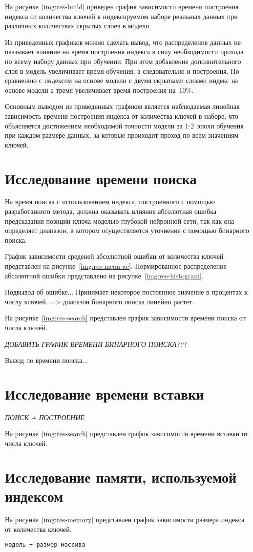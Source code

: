 На рисунке~\ref{img:res-build} приведен график зависимости времени построения
индекса от количества ключей в индексируемом наборе реальных данных при
различных количествах скрытых слоев в модели.


Из приведенных графиков можно сделать вывод, что распределение данных не
оказывает влияние на время построения индекса в силу необходимости прохода по
всему набору данных при обучении. При этом добавление дополнительного слоя в
модель увеличивает время обучения, а следовательно и построения. По сравнению с
индексом на основе модели с двумя скрытыми слоями индекс на основе модели с
тремя увеличивает время построения на~10\%.

Основным выводом из приведенных графиков является наблюдаемая линейная
зависимость времени построения индекса от количества ключей в наборе, что
объясняется достижением необходимой точности модели за \mbox{1-2~эпохи} обучения
при каждом размере данных, за которые проиходит проход по всем значениям ключей.

\section{Исследование времени поиска}

На время поиска с использованием индекса, построенного с помощью разработанного
метода, должна оказывать влияние абсолютная ошибка предсказания позиции ключа
моделью глубокой нейронной сети, так как она определяет диапазон, в котором
осуществляется уточнение с помощью бинарного поиска.

График зависимости среденей абсолютной ошибки от количества ключей представлен
на рисунке~\ref{img:res-mean-ae}. Нормированное распределение абсолютной ошибки
представлено на рисунке~\ref{img:res-histogram}.

Подвывод об ошибке... Принимает некоторое постоянное значение в процентах к
числу ключей. => диапазон бинарного поиска линейно растет.

На рисунке~\ref{img:res-search} представлен график зависимости времени поиска от
числа ключей.

\textit{ДОБАВИТЬ ГРАФИК ВРЕМЕНИ БИНАРНОГО ПОИСКА???}

Вывод по времени поиска...

\section{Исследование времени вставки}

\textit{ПОИСК + ПОСТРОЕНИЕ}

На рисунке~\ref{img:res-search} представлен график зависимости времени вставки
от числа ключей.

\section{Исследование памяти, используемой индексом}

На рисунке~\ref{img:res-memory} представлен график зависимости размера индекса
от количества ключей.

\texttt{модель + размер массива}
